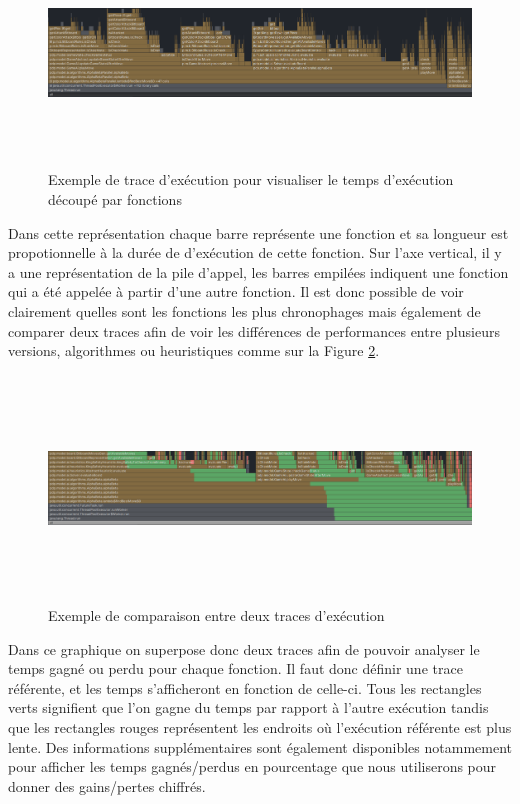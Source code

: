 \documentclass{article}
\begin{document}
\begin{figure}[h]
    \centering
    \includegraphics[width=\textwidth,height=6.0cm,keepaspectratio]{trace_example.png}
    \caption{Exemple de trace d'exécution pour visualiser le temps d'exécution découpé par fonctions}
    \label{trace_ex}
\end{figure}
\FloatBarrier

Dans cette représentation chaque barre représente une fonction et sa longueur est propotionnelle à la durée de d'exécution de cette fonction. Sur l'axe vertical,
il y a une représentation de la pile d'appel, les barres empilées indiquent une fonction qui a été appelée à partir d'une autre fonction.
Il est donc possible de voir clairement quelles sont les fonctions les plus chronophages mais également 
de comparer deux traces afin de voir les différences de performances entre plusieurs versions, algorithmes ou heuristiques comme sur la Figure \ref{trace_ex2}.

\begin{figure}[h]
    \centering
    \includegraphics[width=\textwidth,height=6.0cm,keepaspectratio]{trace_ex2.png}
    \caption{Exemple de comparaison entre deux traces d'exécution}
    \label{trace_ex2}
\end{figure}
\FloatBarrier

Dans ce graphique on superpose donc deux traces afin de pouvoir analyser le temps gagné ou perdu pour chaque fonction. Il faut donc définir une trace référente, et les temps
s'afficheront en fonction de celle-ci. Tous les rectangles verts signifient que l'on gagne du temps par rapport à l'autre exécution tandis que les rectangles rouges représentent
les endroits où l'exécution référente est plus lente. Des informations supplémentaires sont également disponibles notammement pour afficher les temps gagnés/perdus en pourcentage
que nous utiliserons pour donner des gains/pertes chiffrés.
\end{document}
